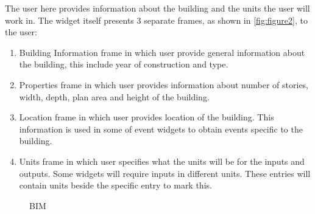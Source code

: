 The user here provides information about the building and the units
the user will work in. The widget itself presents 3 separate frames,
as shown in \autoref{fig:figure2}, to the user:

\begin{enumerate}
\item Building Information frame in which user provide general information about the building, this include year of construction and type.
\item Properties frame in which user provides information about number of stories, width, depth, plan area and height of the building.
\item Location frame in which user provides location of the building. This information is used in some of event widgets to obtain events specific to the building.
\item Units frame  in which user specifies what the units will be for the inputs and outputs. Some widgets will require inputs in different units. These entries will contain units beside the specific entry to mark this.
\end{enumerate}


\begin{figure}[!htbp]
  \caption{BIM}
  \label{fig:figure2}
\end{figure}

